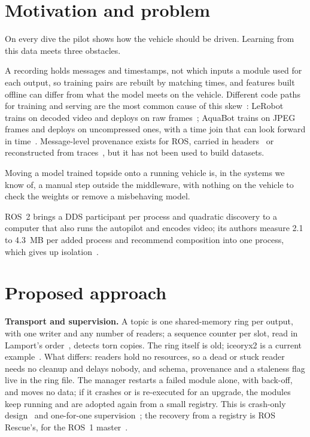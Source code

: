 \documentclass[conference]{IEEEtran}
\begin{document}
\section{Motivation and problem}

On every dive the pilot shows how the vehicle should be driven. Learning from
this data meets three obstacles.

A recording holds messages and timestamps, not which inputs a module used for
each output, so training pairs are rebuilt by matching times, and features
built offline can differ from what the model meets on the vehicle. Different
code paths for training and serving are the most common cause of this
skew~\cite{breck2019datavalidation}: LeRobot trains on decoded video and
deploys on raw frames~\cite{cadene2026lerobot}; AquaBot trains on JPEG frames
and deploys on uncompressed ones, with a time join that can look forward in
time~\cite{liu2025aquabot}. Message-level provenance exists for ROS, carried
in headers~\cite{witte2021provenance} or reconstructed from
traces~\cite{bedard2023messageflow}, but it has not been used to build
datasets.

Moving a model trained topside onto a running vehicle is, in the systems we
know of, a manual step outside the middleware, with nothing on the vehicle to
check the weights or remove a misbehaving model.

ROS~2 brings a DDS participant per process and quadratic discovery to a
computer that also runs the autopilot and encodes video; its authors measure
2.1 to 4.3~MB per added process and recommend composition into one process,
which gives up isolation~\cite{macenski2023composition}.

\section{Proposed approach}

\textbf{Transport and supervision.} A topic is one shared-memory ring per
output, with one writer and any number of readers; a sequence counter per
slot, read in Lamport's order~\cite{lamport1977concurrent}, detects torn
copies. The ring itself is old; iceoryx2 is a current
example~\cite{iceoryx2}. What differs: readers hold no resources, so a dead or
stuck reader needs no cleanup and delays nobody, and schema, provenance and a
staleness flag live in the ring file. The manager restarts a failed module
alone, with back-off, and moves no data; if it crashes or is re-executed for
an upgrade, the modules keep running and are adopted again from a small
registry. This is crash-only design~\cite{candea2003crashonly} and
one-for-one supervision~\cite{armstrong2003thesis}; the recovery from a
registry is ROS Rescue's, for the ROS~1 master~\cite{kaveti2019rosrescue}.
\end{document}
